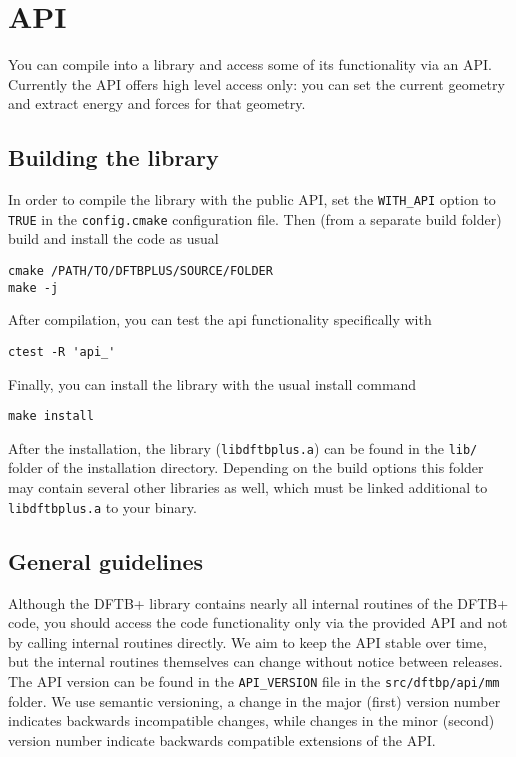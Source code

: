 \chapter{\dftbp{} API}

You can compile \dftbp{} into a library and access some of its functionality via
an API. Currently the API offers high level access only: you can set the current
geometry and extract energy and forces for that geometry.

\section{Building the library}

In order to compile the \dftbp{} library with the public API, set the
\verb|WITH_API| option to \verb|TRUE| in the \verb|config.cmake| configuration
file. Then (from a separate build folder) build and install the code as usual
\begin{verbatim}
cmake /PATH/TO/DFTBPLUS/SOURCE/FOLDER
make -j
\end{verbatim}

After compilation, you can test the api functionality specifically with
\begin{verbatim}
ctest -R 'api_'
\end{verbatim}

Finally, you can install the library with the usual install command
\begin{verbatim}
make install
\end{verbatim}

After the installation, the library (\verb|libdftbplus.a|) can be found in the
\verb|lib/| folder of the installation directory. Depending on the build options
this folder may contain several other libraries as well, which must be linked
additional to \verb|libdftbplus.a| to your binary.

\section{General guidelines}

Although the DFTB+ library contains nearly all internal routines of the DFTB+
code, you should access the code functionality only via the provided API and not
by calling internal routines directly. We aim to keep the API stable over time,
but the internal routines themselves can change without notice between
releases. The API version can be found in the \verb|API_VERSION| file in the
\verb|src/dftbp/api/mm| folder. We use semantic versioning, a change in the
major (first) version number indicates backwards incompatible changes, while
changes in the minor (second) version number indicate backwards compatible
extensions of the API.

